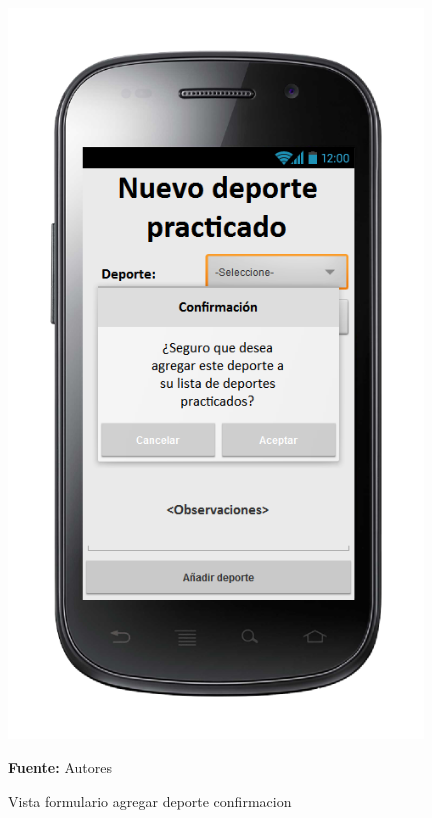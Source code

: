 \begin{figure}[!htb]
  \begin{center}
\includegraphics[width=11cm]{./imagenes/UI/Usuarios/formulario_agregar_deporte_confirmacion.png}
    \caption{Vista formulario agregar deporte confirmacion}
    \label{fig:Vista_formulario_agregar_deporte_confirmacion}
    \textbf{Fuente:}  Autores
  \end{center}
\end{figure}
